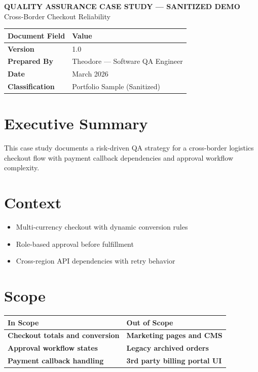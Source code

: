 \documentclass[11pt,a4paper]{article}
\begin{document}
\begin{center}
  {\LARGE \textbf{QUALITY ASSURANCE CASE STUDY --- SANITIZED DEMO}}\\[0.5em]
  {\Large Cross-Border Checkout Reliability}
\end{center}

\vspace{0.8em}

\begin{tabularx}{\textwidth}{>{\bfseries}p{}X}
\toprule
Document Field & Value \\
\midrule
Version & 1.0 \\
Prepared By & Theodore --- Software QA Engineer \\
Date & March 2026 \\
Classification & Portfolio Sample (Sanitized) \\
\bottomrule
\end{tabularx}

\section*{Executive Summary}
This case study documents a risk-driven QA strategy for a cross-border logistics checkout flow with payment callback dependencies and approval workflow complexity.

\section*{Context}
\begin{itemize}
  \item Multi-currency checkout with dynamic conversion rules
  \item Role-based approval before fulfillment
  \item Cross-region API dependencies with retry behavior
\end{itemize}

\section*{Scope}
\begin{tabularx}{\textwidth}{>{\bfseries}p{}>{\bfseries}X}
\toprule
In Scope & Out of Scope \\
\midrule
Checkout totals and conversion & Marketing pages and CMS \\
Approval workflow states & Legacy archived orders \\
Payment callback handling & 3rd party billing portal UI \\
\bottomrule
\end{tabularx}
\end{document}
